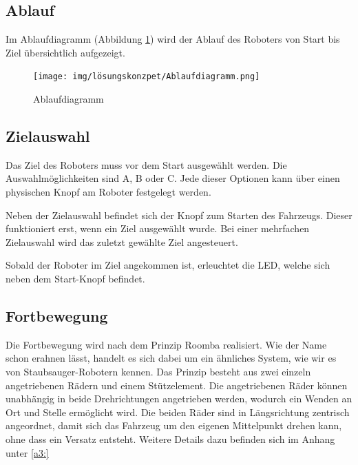 \documentclass[../main.tex]{subfiles}
\begin{document}
\subsection{Ablauf}

Im Ablaufdiagramm (Abbildung \ref{img:ablaufdiagramm}) wird der Ablauf des Roboters von Start bis Ziel übersichtlich aufgezeigt.

\begin{figure}[H]
\texttt{[image: img/lösungskonzpet/Ablaufdiagramm.png]}
\caption{Ablaufdiagramm}
\label{img:ablaufdiagramm}
\end{figure}

\newpage
\subsection{Zielauswahl}

Das Ziel des Roboters muss vor dem Start ausgewählt werden. Die Auswahlmöglichkeiten sind A, B oder C. Jede dieser Optionen kann über einen physischen Knopf am Roboter festgelegt werden.

Neben der Zielauswahl befindet sich der Knopf zum Starten des Fahrzeugs. Dieser funktioniert erst, wenn ein Ziel ausgewählt wurde. Bei einer mehrfachen Zielauswahl wird das zuletzt gewählte Ziel angesteuert.

Sobald der Roboter im Ziel angekommen ist, erleuchtet die LED, welche sich neben dem Start-Knopf befindet. 

\subsection{Fortbewegung} 

Die Fortbewegung wird nach dem Prinzip Roomba realisiert. Wie der Name schon erahnen lässt, handelt es sich dabei um ein ähnliches System, wie wir es von Staubsauger-Robotern kennen. Das Prinzip besteht aus zwei einzeln angetriebenen Rädern und einem Stützelement. Die angetriebenen Räder können unabhängig in beide Drehrichtungen angetrieben werden, wodurch ein Wenden an Ort und Stelle ermöglicht wird. Die beiden Räder sind in Längsrichtung zentrisch angeordnet, damit sich das Fahrzeug um den eigenen Mittelpunkt drehen kann, ohne dass ein Versatz entsteht. Weitere Details dazu befinden sich im Anhang unter \ref{a3:}
\end{document}
